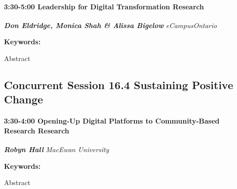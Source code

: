 \documentclass[
]{book}
\begin{document}
\begin{session}
\hypertarget{leadership-for-digital-transformation-research}{%
\paragraph*{\texorpdfstring{3:30-5:00 \textbar{} \textbf{Leadership for
Digital Transformation} \textbar{}
Research}{3:30-5:00 \textbar{} Leadership for Digital Transformation \textbar{} Research}}\label{leadership-for-digital-transformation-research}}

\textbf{\emph{Don Eldridge, Monica Shah \& Alissa Bigelow}} \textbar{}
\emph{eCampusOntario}

\textbf{Keywords:}

Abstract
\end{session}

\hypertarget{concurrent-session-16.4-sustaining-positive-change}{%
\subsection*{Concurrent Session 16.4 \textbar{} Sustaining Positive Change}\label{concurrent-session-16.4-sustaining-positive-change}}

\begin{session}
\hypertarget{opening-up-digital-platforms-to-community-based-research-research}{%
\paragraph*{\texorpdfstring{3:30-4:00 \textbar{} \textbf{Opening-Up
Digital Platforms to Community-Based Research} \textbar{}
Research}{3:30-4:00 \textbar{} Opening-Up Digital Platforms to Community-Based Research \textbar{} Research}}\label{opening-up-digital-platforms-to-community-based-research-research}}

\textbf{\emph{Robyn Hall}} \textbar{} \emph{MacEwan University}

\textbf{Keywords:}

Abstract
\end{session}
\end{document}
